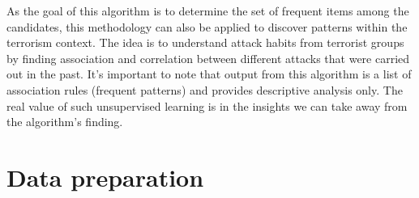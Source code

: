 \documentclass[11pt,oneside,a4paper]{reedthesis}
\begin{document}
As the goal of this algorithm is to determine the set of frequent items
among the candidates, this methodology can also be applied to discover
patterns within the terrorism context. The idea is to understand attack
habits from terrorist groups by finding association and correlation
between different attacks that were carried out in the past. It's
important to note that output from this algorithm is a list of
association rules (frequent patterns) and provides descriptive analysis
only. The real value of such unsupervised learning is in the insights we
can take away from the algorithm's finding.

\section{Data preparation}\label{data-preparation-2}
\end{document}
